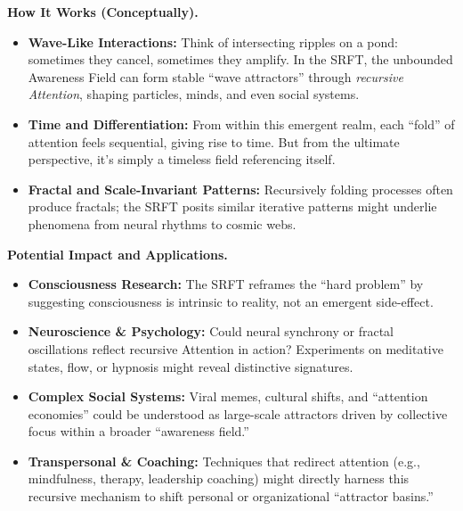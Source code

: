 \documentclass[12pt]{article}
\begin{document}
\medskip
\noindent
\textbf{How It Works (Conceptually).}\\
\begin{itemize}
\item \textbf{Wave-Like Interactions:} Think of intersecting ripples on a pond: 
sometimes they cancel, sometimes they amplify. In the SRFT, the unbounded Awareness 
Field can form stable ``wave attractors'' through \emph{recursive Attention}, 
shaping particles, minds, and even social systems.
\item \textbf{Time and Differentiation:} From within this emergent realm, each 
``fold'' of attention feels sequential, giving rise to time. But from the ultimate 
perspective, it's simply a timeless field referencing itself.
\item \textbf{Fractal and Scale-Invariant Patterns:} Recursively folding processes 
often produce fractals; the SRFT posits similar iterative patterns might underlie 
phenomena from neural rhythms to cosmic webs.
\end{itemize}

\medskip
\noindent
\textbf{Potential Impact and Applications.}\\
\begin{itemize}
\item \textbf{Consciousness Research:} The SRFT reframes the ``hard problem'' 
by suggesting consciousness is intrinsic to reality, not an emergent side-effect.
\item \textbf{Neuroscience \& Psychology:} Could neural synchrony or fractal 
oscillations reflect recursive Attention in action? Experiments on meditative 
states, flow, or hypnosis might reveal distinctive signatures.
\item \textbf{Complex Social Systems:} Viral memes, cultural shifts, and 
“attention economies” could be understood as large-scale attractors driven 
by collective focus within a broader ``awareness field.''
\item \textbf{Transpersonal \& Coaching:} Techniques that redirect attention 
(e.g., mindfulness, therapy, leadership coaching) might directly harness this 
recursive mechanism to shift personal or organizational ``attractor basins.''
\end{itemize}
\end{document}
